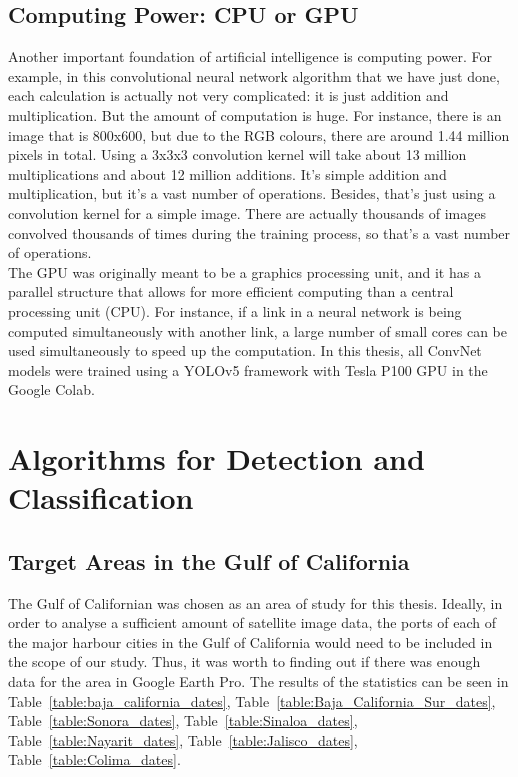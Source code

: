 \subsection{Computing Power: CPU or GPU}
Another important foundation of artificial intelligence is computing power. For example, in this convolutional neural network algorithm that we have just done, each calculation is actually not very complicated: it is just addition and multiplication. But the amount of computation is huge. For instance, there is an image that is 800x600, but due to the RGB colours, there are around 1.44 million pixels in total. Using a 3x3x3 convolution kernel will take about 13 million multiplications and about 12 million additions. It's simple addition and multiplication, but it's a vast number of operations. Besides, that's just using a convolution kernel for a simple image. There are actually thousands of images convolved thousands of times during the training process, so that's a vast number of operations.\\

The GPU was originally meant to be a graphics processing unit, and it has a parallel structure that allows for more efficient computing than a central processing unit (CPU). For instance, if a link in a neural network is being computed simultaneously with another link, a large number of small cores can be used simultaneously to speed up the computation. In this thesis, all ConvNet models were trained using a YOLOv5 framework with Tesla P100 GPU in the Google Colab.\\




\section{Algorithms for Detection and Classification}
\subsection{Target Areas in the Gulf of California}
\label{sec3.2.1}
The Gulf of Californian was chosen as an area of study for this thesis. Ideally, in order to analyse a sufficient amount of satellite image data, the ports of each of the major harbour cities in the Gulf of California would need to be included in the scope of our study. Thus, it was worth to finding out if there was enough data for the area in Google Earth Pro. The results of the statistics can be seen in Table~\ref{table:baja_california_dates}, Table~\ref{table:Baja_California_Sur_dates}, Table~\ref{table:Sonora_dates}, Table~\ref{table:Sinaloa_dates}, Table~\ref{table:Nayarit_dates}, Table~\ref{table:Jalisco_dates}, Table~\ref{table:Colima_dates}.\\

